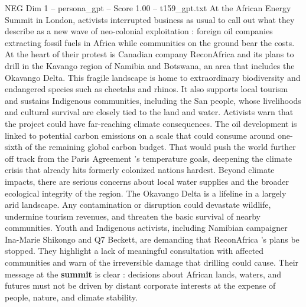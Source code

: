 \begin{textsample}{NEG Dim 1 – persona\_gpt – Score 1.00 – t159\_gpt.txt}  \label{ex:f1_neg_035}
At the African Energy Summit in London, activists interrupted business as usual to call out what they describe as a new wave of neo-colonial exploitation : foreign oil companies extracting fossil fuels in Africa while communities on the ground bear the costs.
At the heart of their protest is Canadian company ReconAfrica and its plans to drill in the Kavango region of Namibia and Botswana, an area that includes the Okavango Delta.
This fragile landscape is home to extraordinary biodiversity and endangered species such as cheetahs and rhinos.
It also supports local tourism and sustains Indigenous communities, including the San people, whose livelihoods and cultural survival are closely tied to the land and water.
Activists warn that the project could have far-reaching climate consequences.
The oil development is linked to potential carbon emissions on a scale that could consume around one-sixth of the remaining global carbon budget.
That would push the world further off track from the Paris Agreement ’s temperature goals, deepening the climate crisis that already hits formerly colonized nations hardest.
Beyond climate impacts, there are serious concerns about local water supplies and the broader ecological integrity of the region.
The Okavango Delta is a lifeline in a largely arid landscape.
Any contamination or disruption could devastate wildlife, undermine tourism revenues, and threaten the basic survival of nearby communities.
Youth and Indigenous activists, including Namibian campaigner Ina-Marie Shikongo and Q7 Beckett, are demanding that ReconAfrica ’s plans be stopped.
They highlight a lack of meaningful consultation with affected communities and warn of the irreversible damage that drilling could cause.
Their message at the \textbf{summit} is clear : decisions about African lands, waters, and futures must not be driven by distant corporate interests at the expense of people, nature, and climate stability.

\end{textsample}
